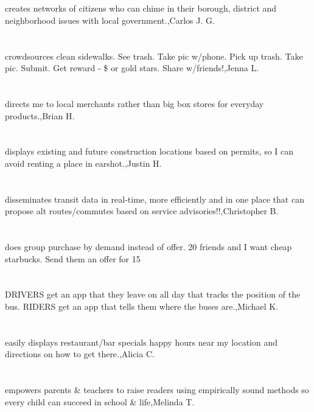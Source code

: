 \section{}creates networks of citizens who can chime in their borough, district and neighborhood issues with local government.,Carlos J.  G.	
\section{}crowdsources clean sidewalks. See trash. Take pic w/phone. Pick up trash. Take pic. Submit. Get reward - \$ or gold stars. Share w/friends!,Jenna L.	
\section{}directs me to local merchants rather than big box stores for everyday products.,Brian H.	
\section{}displays existing and future construction locations based on permits, so I can avoid renting a place in earshot.,Justin H.	
\section{}disseminates transit data in real-time, more efficiently and in one place that can propose alt routes/commutes based on service advisories!!,Christopher B.	
\section{}does group purchase by demand instead of offer. 20 friends and I want cheap starbucks. Send them an offer for 15%
\section{}DRIVERS get an app that they leave on all day that tracks the position of the bus. RIDERS get an app that tells them where the buses are.,Michael K.	
\section{}easily displays restaurant/bar specials happy hours near my location and directions on how to get there.,Alicia C.	
\section{}empowers parents \& teachers to raise readers using empirically sound methods so every child can succeed in school  \& life,Melinda T.	
